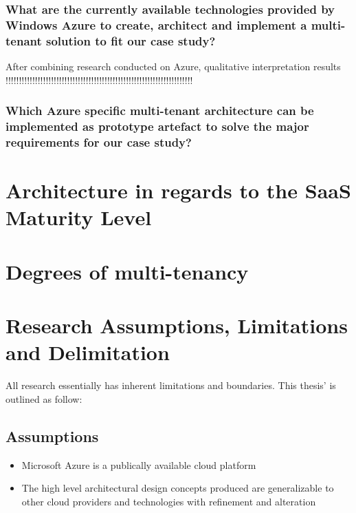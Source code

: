 \subsubsection{\textbf{What are the currently available technologies provided by Windows Azure to create, architect and implement a multi-tenant solution to fit our case study?}}

After combining research conducted on Azure, qualitative interpretation results 
!!!!!!!!!!!!!!!!!!!!!!!!!!!!!!!!!!!!!!!!!!!!!!!!!!!!!!!!!!!!!!!!!!!!!!

\subsubsection{\textbf{Which Azure specific multi-tenant architecture can be implemented as prototype artefact to solve the major requirements for our case study?}}


\section{Architecture in regards to the SaaS Maturity Level}

\section{Degrees of multi-tenancy}

\section{Research Assumptions, Limitations and Delimitation}
All research essentially has inherent limitations and boundaries. This thesis' is outlined as follow:
\subsection{Assumptions}
\begin{itemize}
\item Microsoft Azure is a publically available cloud platform
\item The high level architectural design concepts produced are generalizable to other cloud providers and technologies with refinement and alteration
\end{itemize}

